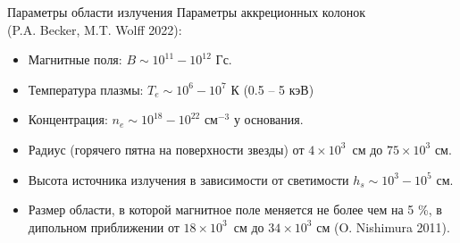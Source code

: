 \documentclass{beamer}
\begin{document}
\begin{frame}{Параметры области излучения}
	\centering
	Параметры аккреционных колонок \\ (P.A. Becker, M.T. Wolff 2022):
	\vspace{2mm}
	\begin{itemize}
		\item[1.] Магнитные поля: $B\sim 10^{11}-10^{12}$ Гс.
		\item[2.] Температура плазмы: $T_e \sim 10^6 - 10^7 $ К (0.5 -- 5 кэВ)
		\item[3.] Концентрация: $n_e \sim 10^{18} - 10^{22}$ см$^{-3}$ у основания.
		\item[4.] Радиус (горячего пятна на поверхности звезды) от $4 \times 10^3$~см до $75 \times 10^3$ см.
		\item[5.] Высота источника излучения в зависимости от светимости $h_s \sim 10^3 - 10^5$ см.
		\vspace{2mm}
		
		
		\item[6.] Размер области, в которой магнитное поле меняется не более чем на 5 \%, в дипольном приближении от $18 \times 10^3$~см до $34 \times 10^3$ см (O. Nishimura 2011).
	\end{itemize}
\end{frame}
\end{document}
